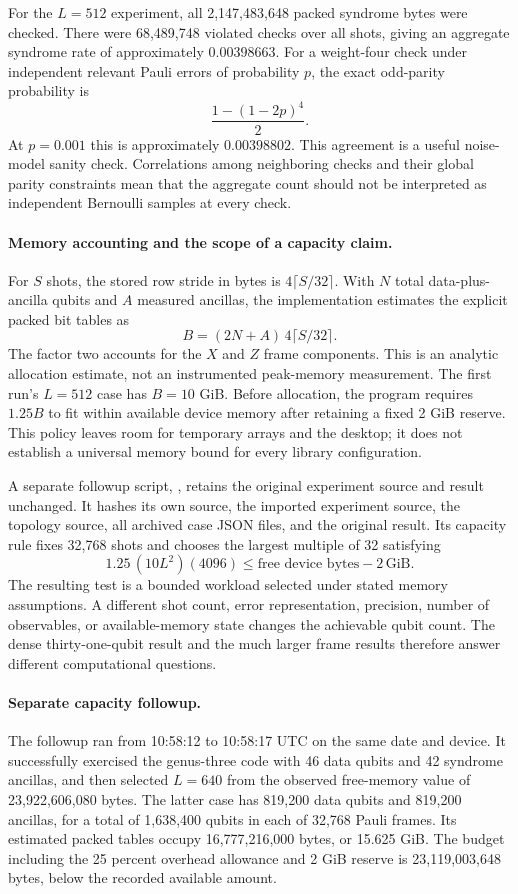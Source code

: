 For the $L=512$ experiment, all 2,147,483,648 packed syndrome bytes were
checked.  There were 68,489,748 violated checks over all shots, giving
an aggregate syndrome rate of approximately $0.00398663$.  For a
weight-four check under independent relevant Pauli errors of probability
$p$, the exact odd-parity probability is
\[
 \frac{1-(1-2p)^4}{2}.
\]
At $p=0.001$ this is approximately $0.00398802$.  This agreement is a
useful noise-model sanity check.  Correlations among neighboring checks
and their global parity constraints mean that the aggregate count should
not be interpreted as independent Bernoulli samples at every check.

\paragraph{Memory accounting and the scope of a capacity claim.}
For $S$ shots, the stored row stride in bytes is
$4\lceil S/32\rceil$.  With $N$ total data-plus-ancilla qubits and $A$
measured ancillas, the implementation estimates the explicit packed bit
tables as
\[
 B=(2N+A)\,4\lceil S/32\rceil.
\]
The factor two accounts for the $X$ and $Z$ frame components.  This is
an analytic allocation estimate, not an instrumented peak-memory
measurement.  The first run's $L=512$ case has $B=10$ GiB.  Before
allocation, the program requires $1.25B$ to fit within available device
memory after retaining a fixed 2 GiB reserve.  This policy leaves room
for temporary arrays and the desktop; it does not establish a universal
memory bound for every library configuration.

A separate followup script, ,
retains the original experiment source and result unchanged.  It hashes
its own source, the imported experiment source, the topology source,
all archived case JSON files, and the original result.  Its capacity
rule fixes 32,768 shots and chooses the largest multiple of 32 satisfying
\[
 1.25\,(10L^2)(4096)\leq
       \text{free device bytes}-2\,\mathrm{GiB}.
\]
The resulting test is a bounded workload selected under stated memory
assumptions.  A different shot count, error representation, precision,
number of observables, or available-memory state changes the achievable
qubit count.  The dense thirty-one-qubit result and the much larger
frame results therefore answer different computational questions.

\paragraph{Separate capacity followup.}
The followup ran from 10:58:12 to 10:58:17 UTC on the same date and
device.  It successfully exercised the genus-three code with 46 data
qubits and 42 syndrome ancillas, and then selected $L=640$ from the
observed free-memory value of 23,922,606,080 bytes.  The latter case has
819,200 data qubits and 819,200 ancillas, for a total of 1,638,400
qubits in each of 32,768 Pauli frames.  Its estimated packed tables
occupy 16,777,216,000 bytes, or 15.625 GiB.  The budget including the
25 percent overhead allowance and 2 GiB reserve is 23,119,003,648
bytes, below the recorded available amount.

